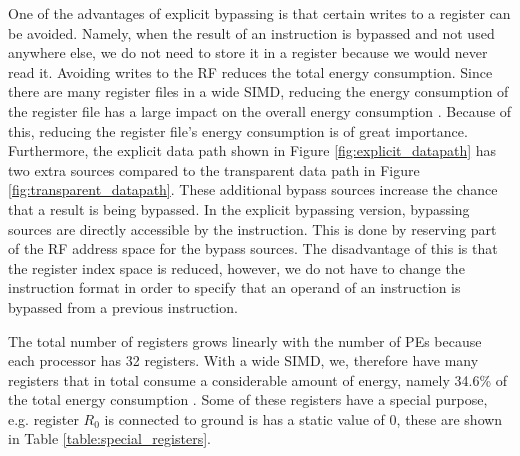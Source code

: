 One of the advantages of explicit bypassing is that certain writes to a register can be avoided. Namely, when the result of an instruction is bypassed and not used anywhere else, we do not need to store it in a register because we would never read it. Avoiding writes to the RF reduces the total energy consumption. Since there are many register files in a wide SIMD, reducing the energy consumption of the register file has a large impact on the overall energy consumption \cite{dongrio1}. Because of this, reducing the register file's energy consumption is of great importance. Furthermore, the explicit data path shown in Figure \ref{fig:explicit_datapath} has two extra sources compared to the transparent data path in Figure \ref{fig:transparent_datapath}. These additional bypass sources increase the chance that a result is being bypassed. In the explicit bypassing version, bypassing sources are directly accessible by the instruction. This is done by reserving part of the RF address space for the bypass sources. The disadvantage of this is that the register index space is reduced, however, we do not have to change the instruction format in order to specify that an operand of an instruction is bypassed from a previous instruction.

The total number of registers grows linearly with the number of PEs because each processor has 32 registers. With a wide SIMD, we, therefore have many registers that in total consume a considerable amount of energy, namely 34.6\% of the total energy consumption \cite{dongrio1}. Some of these registers have a special purpose, e.g. register $R_0$ is connected to ground is has a static value of $0$, these are shown in Table \ref{table:special_registers}.







